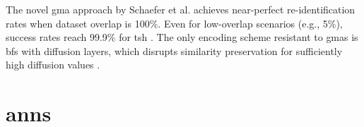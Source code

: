 The novel \ac{gma} approach by Schaefer et al. achieves near-perfect re-identification rates when dataset overlap is 100\%.
Even for low-overlap scenarios (e.g., 5\%), success rates reach 99.9\% for \ac{tsh} \cite{schaefer2024}.
The only encoding scheme resistant to \ac{gma}s is \ac{bf}s with diffusion layers, which disrupts similarity preservation for sufficiently high diffusion values \cite{schaefer2024}.


\section{\ac{ann}s} \label{sec:nn}


